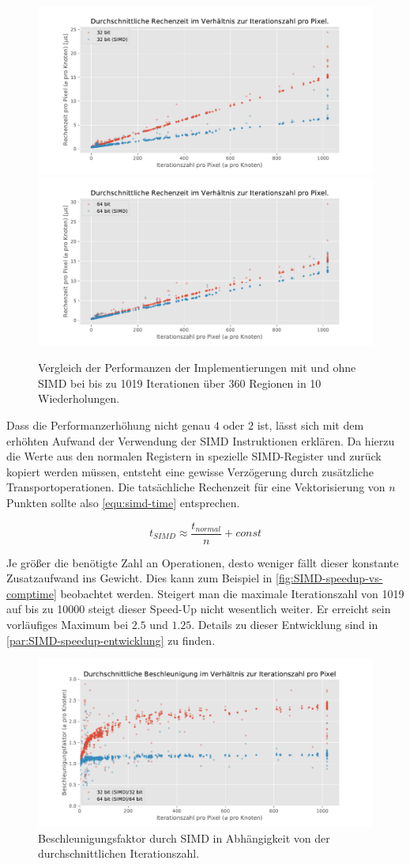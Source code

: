 \begin{figure}
	\centering
	\includegraphics[width=0.45\linewidth]{img/Evaluation/simd/itvscmp32.pdf}
	\includegraphics[width=0.45\linewidth]{img/Evaluation/simd/itvscmp64.pdf}
	\caption{Vergleich der Performanzen der Implementierungen mit und ohne SIMD bei bis zu 1019 Iterationen über 360 Regionen in 10 Wiederholungen.}
	\label{fig:SIMD-speedup}
\end{figure}

Dass die Performanzerhöhung nicht genau $4$ oder $2$ ist, lässt sich mit dem erhöhten Aufwand der Verwendung
der SIMD Instruktionen erklären.
Da hierzu die Werte aus den normalen Registern in spezielle SIMD-Register und zurück
kopiert werden müssen, entsteht eine gewisse Verzögerung durch zusätzliche Transportoperationen.
Die tatsächliche Rechenzeit für eine Vektorisierung von \(n\) Punkten sollte also \autoref{equ:simd-time} entsprechen.

\begin{equation}\label{equ:simd-time}
	t_{SIMD} \approx \frac{t_{normal}}{n}+ const
\end{equation}

Je größer die benötigte Zahl an Operationen, desto weniger fällt dieser konstante Zusatzaufwand ins Gewicht.
Dies kann zum Beispiel in \autoref{fig:SIMD-speedup-vs-comptime} beobachtet werden.
Steigert man die maximale Iterationszahl von 1019 auf bis zu 10000 steigt dieser Speed-Up nicht wesentlich weiter.
Er erreicht sein vorläufiges Maximum bei $2.5$ und $1.25$. Details zu dieser Entwicklung sind in \autoref{par:SIMD-speedup-entwicklung} zu finden.

\begin{figure}
	\centering
	\includegraphics[width=0.9\linewidth]{img/Evaluation/simd/speedup.pdf}
	\caption{Beschleunigungsfaktor durch SIMD in Abhängigkeit von der durchschnittlichen Iterationszahl.}
	\label{fig:SIMD-speedup-vs-comptime}
\end{figure}

